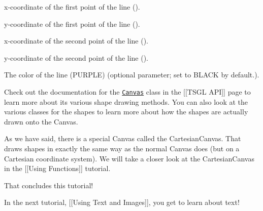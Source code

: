 \begin{DoxyItemize}
\item x-\/coordinate of the first point of the line ({}).
\item y-\/coordinate of the first point of the line ({}).
\item x-\/coordinate of the second point of the line ({}).
\item y-\/coordinate of the second point of the line ({}).
\item The color of the line ({\ttfamily P\-U\-R\-P\-L\-E}) (optional parameter; set to {\ttfamily B\-L\-A\-C\-K} by default.).
\end{DoxyItemize}

Check out the documentation for the \href{http://calvin-cs.github.io/TSGL/html/_canvas_8h_source.html}{\tt Canvas} class in the \mbox{[}\mbox{[}T\-S\-G\-L A\-P\-I\mbox{]}\mbox{]} page to learn more about its various shape drawing methods. You can also look at the various classes for the shapes to learn more about how the shapes are actually drawn onto the Canvas.

As we have said, there is a special Canvas called the Cartesian\-Canvas. That draws shapes in exactly the same way as the normal Canvas does (but on a Cartesian coordinate system). We will take a closer look at the Cartesian\-Canvas in the \mbox{[}\mbox{[}Using Functions\mbox{]}\mbox{]} tutorial.

That concludes this tutorial!

In the next tutorial, \mbox{[}\mbox{[}Using Text and Images\mbox{]}\mbox{]}, you get to learn about text! 